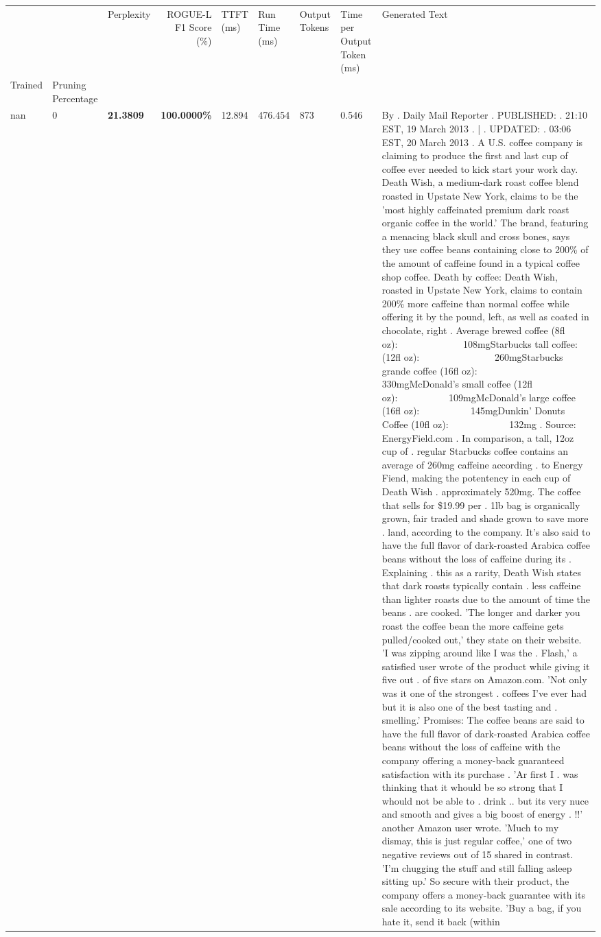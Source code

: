 \begin{table}[H]
{\label{tab:evaluation-pipeline-6}
\begin{tabular}{lllrlllll}
\toprule
 &  & Perplexity & ROGUE-L F1 Score (\%) & TTFT (ms) & Run Time (ms) & Output Tokens & Time per Output Token (ms) & Generated Text \\
Trained & Pruning Percentage &  &  &  &  &  &  &  \\
\midrule
nan & 0 & \bfseries 21.3809 & \bfseries 100.0000\% & 12.894 & 476.454 & 873 & 0.546 & By . Daily Mail Reporter . PUBLISHED: . 21:10 EST, 19 March 2013 . | . UPDATED: . 03:06 EST, 20 March 2013 . A U.S. coffee company is claiming to produce the first and last cup of coffee ever needed to kick start your work day. Death Wish, a medium-dark roast coffee blend roasted in Upstate New York, claims to be the 'most highly caffeinated premium dark roast organic coffee in the world.' The brand, featuring a menacing black skull and cross bones, says they use coffee beans containing close to 200\% of the amount of caffeine found in a typical coffee shop coffee. Death by coffee: Death Wish, roasted in Upstate New York, claims to contain 200\% more caffeine than normal coffee while offering it by the pound, left, as well as coated in chocolate, right . Average brewed coffee (8fl oz):              108mgStarbucks tall coffee: (12fl oz):                260mgStarbucks grande coffee (16fl oz):         330mgMcDonald's small coffee (12fl oz):           109mgMcDonald's large coffee (16fl oz):           145mgDunkin' Donuts Coffee (10fl oz):             132mg . Source: EnergyField.com . In comparison, a tall, 12oz cup of . regular Starbucks coffee contains an average of 260mg caffeine according . to Energy Fiend, making the potentency in each cup of Death Wish . approximately 520mg. The coffee that sells for \$19.99 per . 1lb bag is organically grown, fair traded and shade grown to save more . land, according to the company. It's also said to have the full flavor of dark-roasted Arabica coffee beans without the loss of caffeine during its . Explaining . this as a rarity, Death Wish states that dark roasts typically contain . less caffeine than lighter roasts due to the amount of time the beans . are cooked. 'The longer and darker you roast the coffee bean the more caffeine gets pulled/cooked out,' they state on their website. 'I was zipping around like I was the . Flash,' a satisfied user wrote of the product while giving it five out . of five stars on Amazon.com. 'Not only was it one of the strongest . coffees I've ever had but it is also one of the best tasting and . smelling.’ Promises: The coffee beans are said to have the full flavor of dark-roasted Arabica coffee beans without the loss of caffeine with the company offering a money-back guaranteed satisfaction with its purchase . 'Ar first I . was thinking that it whould be so strong that I whould not be able to . drink .. but its very nuce and smooth and gives a big boost of energy . !!' another Amazon user wrote. 'Much to my dismay, this is just regular coffee,' one of two negative reviews out of 15 shared in contrast. 'I'm chugging the stuff and still falling asleep sitting up.' So secure with their product, the company offers a money-back guarantee with its sale according to its website. 'Buy a bag, if you hate it, send it back (within 
\end{tabular}}
\end{table}
